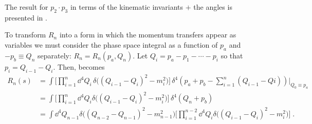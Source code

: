 The result for $p_2 \cdot p_3$ in terms of the kinematic invariants $+$ the angles is presented in .

To transform $R_n$ into a form in which the momentum transfers appear as variables we must consider the phase space integral as a function of $p_a$ and $-p_b \equiv Q_n$ separately: $R_n = R_n(p_a, Q_n)$. 
Let $Q_i = p_a - p_1 - \cdots - p_i$ so that $p_i = Q_{i-1} - Q_i$. 
Then,  becomes
\reversemarginpar{}
\begin{equation}
    \label{eq:phase-space-integral-with-momentum-transfer}
    \begin{aligned}
        R_n(s) 
        &= \int \bigg[
            \prod_{i=1}^{n}
            \dd^4 Q_i \,
            \delta \big( 
                        (Q_{i-1} - Q_i)^2 - m_i^2
                    \big)
            \bigg] \,
            \delta^4 ( p_a + p_b - \sum_{i=1}^{n} (Q_{i - 1} - Q{i})) \vert_{Q_0 \equiv p_a} \\
        &= \int \bigg[
            \prod_{i=1}^{n}
            \dd^4 Q_i
            \delta \big( 
                        (Q_{i-1} - Q_i)^2 - m_i^2
                    \big)
            \bigg] \,
            \delta^4 ( Q_n + p_b) \\
        &= \int 
            \dd^4 Q_{n-1} 
            \delta \big( 
                        (Q_{n-2} - Q_{n-1})^2 - m_{n-1}^2
                    \big) 
            \bigg[
            \prod_{i=1}^{n-2}
            \dd^4 Q_i
            \delta \big( 
                        (Q_{i-1} - Q_i)^2 - m_i^2
                    \big)
            \bigg] \; .
    \end{aligned}
\end{equation}

